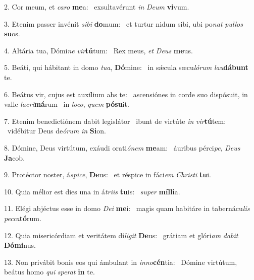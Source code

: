 2. Cor meum, et \textit{ca}\textit{ro} \textbf{me}a: \ast\  exsultavérunt \textit{in} \textit{De}\textit{um} \textbf{vi}vum.\

3. Etenim passer invénit \textit{si}\textit{bi} \textbf{do}mum: \ast\  et turtur nidum sibi, ubi po\textit{nat} \textit{pul}\textit{los} \textbf{su}os.\

4. Altária tua, Dómi\textit{ne} \textit{vir}\textbf{tú}tum: \ast\  Rex meus, \textit{et} \textit{De}\textit{us} \textbf{me}us.\

5. Beáti, qui hábitant in domo \textit{tu}\textit{a}, \textbf{Dó}mine: \ast\  in sǽcula sæcu\textit{ló}\textit{rum} \textit{lau}\textbf{dá}\textbf{bunt} te.\

6. Beátus vir, cujus est auxílium abs te: \dag\  ascensiónes in corde suo dispósuit, in valle \textit{la}\textit{cri}\textbf{má}rum \ast\  in \textit{lo}\textit{co}, \textit{quem} \textbf{pó}\textbf{su}it.\

7. Etenim benedictiónem dabit legislátor \dag\  ibunt de virtúte \textit{in} \textit{vir}\textbf{tú}tem: \ast\  vidébitur Deus de\textit{ó}\textit{rum} \textit{in} \textbf{Si}on.\

8. Dómine, Deus virtútum, exáudi orati\textit{ó}\textit{nem} \textbf{me}am: \ast\  áuribus pérci\textit{pe}, \textit{De}\textit{us} \textbf{Ja}cob.\

9. Protéctor noster, á\textit{spi}\textit{ce}, \textbf{De}us: \ast\  et réspice in fáci\textit{em} \textit{Chris}\textit{ti} \textbf{tu}i.\

10. Quia mélior est dies una in á\textit{tri}\textit{is} \textbf{tu}is: \ast\  \textit{su}\textit{per} \textbf{míl}\textbf{li}a.\

11. Elégi abjéctus esse in domo \textit{De}\textit{i} \textbf{me}i: \ast\  magis quam habitáre in tabernácu\textit{lis} \textit{pec}\textit{ca}\textbf{tó}rum.\

12. Quia misericórdiam et veritátem dí\textit{li}\textit{git} \textbf{De}us: \ast\  grátiam et glóri\textit{am} \textit{da}\textit{bit} \textbf{Dó}\textbf{mi}nus.\

13. Non privábit bonis eos qui ámbulant in \textit{in}\textit{no}\textbf{cén}tia: \ast\  Dómine virtútum, beátus homo \textit{qui} \textit{spe}\textit{rat} \textbf{in} te.\


